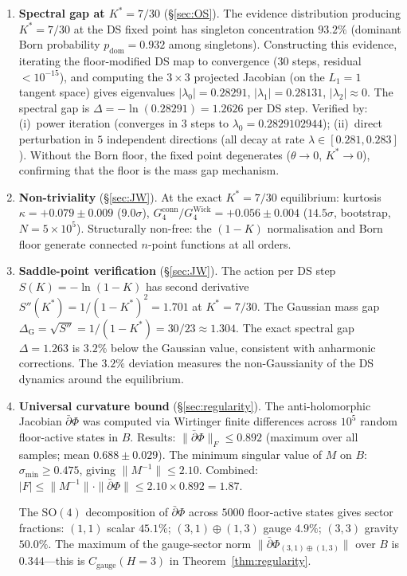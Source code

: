 \documentclass[11pt,a4paper]{article}
\theoremstyle{definition}
\theoremstyle{remark}
\newcommand{\dbar}{\bar{\partial}}
\begin{document}
\begin{enumerate}[nosep]
\item \textbf{Spectral gap at $K^*=7/30$} (\S\ref{sec:OS}). The evidence distribution producing $K^*=7/30$ at the DS fixed point has singleton concentration $93.2\%$ (dominant Born probability $p_{\mathrm{dom}}=0.932$ among singletons). Constructing this evidence, iterating the floor-modified DS map to convergence ($30$ steps, residual $<10^{-15}$), and computing the $3\times 3$ projected Jacobian (on the $L_1=1$ tangent space) gives eigenvalues $|\lambda_0|=0.28291$, $|\lambda_1|=0.28131$, $|\lambda_2|\approx 0$. The spectral gap is $\Delta=-\ln(0.28291)=1.2626$ per DS step. Verified by: (i)~power iteration (converges in $3$ steps to $\lambda_0=0.2829102944$); (ii)~direct perturbation in $5$ independent directions (all decay at rate $\lambda\in[0.281,0.283]$). Without the Born floor, the fixed point degenerates ($\theta\to 0$, $K^*\to 0$), confirming that the floor is the mass gap mechanism.

\item \textbf{Non-triviality} (\S\ref{sec:JW}). At the exact $K^*=7/30$ equilibrium: kurtosis $\kappa=+0.079\pm 0.009$ ($9.0\sigma$), $G_4^{\mathrm{conn}}/G_4^{\mathrm{Wick}}=+0.056\pm 0.004$ ($14.5\sigma$, bootstrap, $N=5\times 10^5$). Structurally non-free: the $(1\!-\!K)$ normalisation and Born floor generate connected $n$-point functions at all orders.

\item \textbf{Saddle-point verification} (\S\ref{sec:JW}). The action per DS step $S(K)=-\ln(1-K)$ has second derivative $S''(K^*)=1/(1-K^*)^2=1.701$ at $K^*=7/30$. The Gaussian mass gap $\Delta_{\mathrm{G}}=\sqrt{S''}=1/(1-K^*)=30/23\approx 1.304$. The exact spectral gap $\Delta=1.263$ is $3.2\%$ below the Gaussian value, consistent with anharmonic corrections. The $3.2\%$ deviation measures the non-Gaussianity of the DS dynamics around the equilibrium.

\item \textbf{Universal curvature bound} (\S\ref{sec:regularity}). The anti-holomorphic Jacobian $\dbar\Phi$ was computed via Wirtinger finite differences across $10^5$ random floor-active states in $B$. Results: $\|\dbar\Phi\|_F\leq 0.892$ (maximum over all samples; mean $0.688\pm 0.029$). The minimum singular value of $M$ on $B$: $\sigma_{\min}\geq 0.475$, giving $\|M^{-1}\|\leq 2.10$. Combined: $|F|\leq\|M^{-1}\|\cdot\|\dbar\Phi\|\leq 2.10\times 0.892=1.87$.

The $\mathrm{SO}(4)$ decomposition of $\dbar\Phi$ across $5000$ floor-active states gives sector fractions: $(1,1)$ scalar $45.1\%$; $(3,1)\oplus(1,3)$ gauge $4.9\%$; $(3,3)$ gravity $50.0\%$. The maximum of the gauge-sector norm $\|\dbar\Phi_{(3,1)\oplus(1,3)}\|$ over $B$ is $0.344$---this is $C_{\mathrm{gauge}}(H\!=\!3)$ in Theorem~\ref{thm:regularity}.


\end{enumerate}
\end{document}
